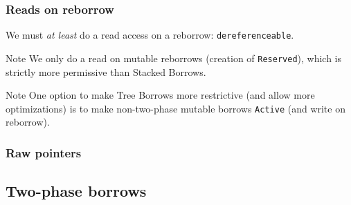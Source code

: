 \begin{frame}
    \frametitle{Reads on reborrow}
    We must \textit{at least} do a read access on a reborrow: \texttt{dereferenceable}.\\

    \begin{block}{Note}
        We only do a read on mutable reborrows (creation of \texttt{Reserved}),
        which is strictly more permissive than Stacked Borrows.
    \end{block}

    \begin{block}{Note}
        One option to make Tree Borrows more restrictive (and allow more optimizations)
        is to make non-two-phase mutable borrows \texttt{Active} (and write on reborrow).
    \end{block}
\end{frame}

\begin{frame}
    \frametitle{Raw pointers}
\end{frame}

\subsection{Two-phase borrows}

